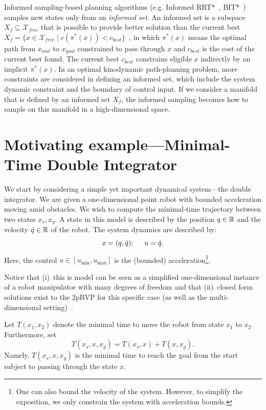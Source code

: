 \documentclass[letterpaper, 10 pt, conference]{ieeeconf}  %
\begin{document}
Informed sampling-based planning algorithms (e.g. Informed RRT*~\cite{GSB14}, BIT*~\cite{GSB15}) samples new states only from an \emph{informed set}.
An informed set is a subspace $ X_f \subseteq \mathcal{X}_{free} $  that is possible to provide better solution than the current best $  X_f = \{ x \in \mathcal{X}_{free} \mid c ( \pi^*(x) ) < c_{best} \} $~\cite{GSB14}, in which $ \pi^*(x) $ means the optimal path from $ x_{init} $ to $ x_{goal} $ constrained to pass through $ x $ and $ c_{best} $ is the cost of the current best found.
The current best $ c_{best} $ constrains eligible $ x $ indirectly by an implicit $ \pi^*(x) $.
In an optimal kinodynamic path-planning problem, more constraints are considered in defining an informed set, which include the system dynamic constraint and the boundary of control input.
If we consider a manifold that is defined by an informed set $ X_f $, the informed sampling becomes how to sample on this manifold in a high-dimensional space. 

\section{Motivating example---Minimal-Time Double Integrator}

We start by considering a simple yet important dynamical system---the double integrator. 
We are given a one-dimensional point robot with bounded acceleration moving amid obstacles. We wish to compute the minimal-time trajectory between two states $x_s, x_g$.
A state in this model is described by 
the position $q \in \mathbb{R}$
and
the velocity $\dot{q}\in \mathbb{R}$ of the robot.
The system dynamics are described by:
\begin{equation}
x = (q, \dot{q}); 
\hspace{5mm}
u = \ddot{q}.
\end{equation}
Here, the control $u \in [u_{\text{min}}, u_{\text{max}}]$ is the (bounded) acceleration\footnote{One can also bound the velocity of the system. However, to simplify the exposition, we only constrain the system with acceleration bounds.}. 


Notice that 
(i)~this is model can be seen as a simplified one-dimensional instance of a robot manipulator with many degrees of freedom and that
(ii)~closed form solutions exist to the 2pBVP for this specific case (as well as the multi-dimensional setting)~\cite{HN10, KS14}.

Let $T(x_1, x_2)$ denote the minimal time to move the robot from state $x_1$ to $x_2$.
Furthermore, set
%
\begin{equation}
T(x_s, x, x_g) = T(x_s, x) + T(x, x_g).
\end{equation}
%
Namely, $T(x_s, x, x_g)$ is the minimal time to reach the goal from the start subject to passing through the state $x$.
\end{document}
